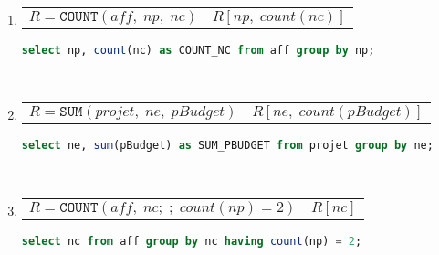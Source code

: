 \documentclass[12pt,a4paper,openany]{book}
\newcommand{\acount}{\texttt{COUNT}}
\newcommand{\asum}{\texttt{SUM}}
\begin{document}
\begin{enumerate}
	\item 
			\begin{tabular}{p{8cm}p{4cm}}
	$R = \acount(aff,\; np,\; nc)$  & $R[np,\; count(nc)]$
			\end{tabular}
	\begin{lstlisting}[language=SQL, numbers=none]
select np, count(nc) as COUNT_NC from aff group by np;
	\end{lstlisting}
	 ~
	\item 
			\begin{tabular}{p{8cm}p{4cm}}
	$R = \asum(projet,\; ne,\; pBudget)$  & $R[ne,\; count(pBudget)]$
			\end{tabular}
	\begin{lstlisting}[language=SQL, numbers=none]
select ne, sum(pBudget) as SUM_PBUDGET from projet group by ne;
	\end{lstlisting}
	 ~
	\item 
			\begin{tabular}{p{8cm}p{4cm}}
	$R = \acount(aff,\; nc;\; ;\; count(np) = 2)$ & $R[nc]$
			\end{tabular}
	\begin{lstlisting}[language=SQL, numbers=none]
select nc from aff group by nc having count(np) = 2;
	\end{lstlisting}
	\end{enumerate}
	
\end{document}
